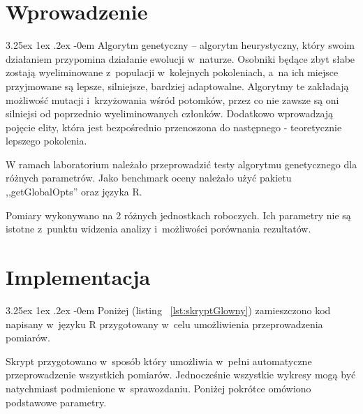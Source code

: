 \documentclass[11pt, a4paper]{article}
\date{\today}
\makeatletter
\newcommand{\fbi}{\leavevmode{\parindent=1em\indent}}
\renewcommand\paragraph{\@startsection{paragraph}{5}{\z@}
  {3.25ex \@plus1ex \@minus.2ex}
  {-0em}
  {\normalfont\normalsize\bfseries}}
\makeatother
\begin{document}


\tableofcontents

\newpage
\section{Wprowadzenie}
\paragraph{}
Algorytm genetyczny – algorytm heurystyczny, który swoim działaniem przypomina działanie ewolucji w~naturze. Osobniki będące zbyt słabe zostają wyeliminowane z~populacji w~kolejnych pokoleniach, a~na ich miejsce przyjmowane są lepsze, silniejsze, bardziej adaptowalne. Algorytmy te zakładają możliwość mutacji i~krzyżowania wśród potomków, przez co nie zawsze są oni silniejsi od poprzednio wyeliminowanych członków. Dodatkowo wprowadzają pojęcie elity, która jest bezpośrednio przenoszona do następnego - teoretycznie lepszego pokolenia.

\fbi
W ramach laboratorium należało przeprowadzić testy algorytmu genetycznego dla różnych parametrów. Jako benchmark oceny należało użyć pakietu ,,getGlobalOpts'' oraz języka R.

\fbi
Pomiary wykonywano na 2 różnych jednostkach roboczych. Ich parametry nie są istotne z~punktu widzenia analizy i~możliwości porównania rezultatów.

\section{Implementacja}
\paragraph{}
Poniżej (listing ~\ref{lst:skryptGlowny}) zamieszczono kod napisany w~języku R przygotowany w~celu umożliwienia przeprowadzenia pomiarów.



\fbi
Skrypt przygotowano w~sposób który umożliwia w~pełni automatyczne przeprowadzenie wszystkich pomiarów. Jednocześnie wszystkie wykresy mogą być natychmiast podmienione w~sprawozdaniu. Poniżej pokrótce omówiono podstawowe parametry.
\end{document}
